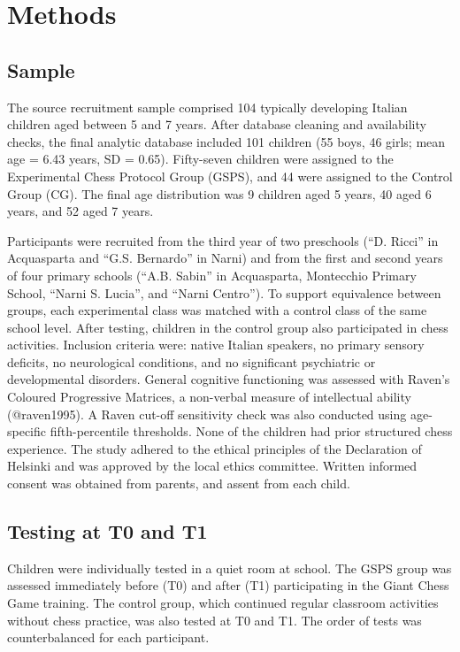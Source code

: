 \documentclass[
  letterpaper,
  DIV=11,
  numbers=noendperiod]{scrartcl}
\begin{document}
\section{Methods}\label{methods}

\subsection{Sample}\label{sample}

The source recruitment sample comprised 104 typically developing Italian
children aged between 5 and 7 years. After database cleaning and
availability checks, the final analytic database included 101 children
(55 boys, 46 girls; mean age = 6.43 years, SD = 0.65). Fifty-seven
children were assigned to the Experimental Chess Protocol Group (GSPS),
and 44 were assigned to the Control Group (CG). The final age
distribution was 9 children aged 5 years, 40 aged 6 years, and 52 aged 7
years.

Participants were recruited from the third year of two preschools (``D.
Ricci'' in Acquasparta and ``G.S. Bernardo'' in Narni) and from the
first and second years of four primary schools (``A.B. Sabin'' in
Acquasparta, Montecchio Primary School, ``Narni S. Lucia'', and ``Narni
Centro''). To support equivalence between groups, each experimental
class was matched with a control class of the same school level. After
testing, children in the control group also participated in chess
activities. Inclusion criteria were: native Italian speakers, no primary
sensory deficits, no neurological conditions, and no significant
psychiatric or developmental disorders. General cognitive functioning
was assessed with Raven's Coloured Progressive Matrices, a non-verbal
measure of intellectual ability (@raven1995). A Raven cut-off
sensitivity check was also conducted using age-specific fifth-percentile
thresholds. None of the children had prior structured chess experience.
The study adhered to the ethical principles of the Declaration of
Helsinki and was approved by the local ethics committee. Written
informed consent was obtained from parents, and assent from each child.

\subsection{Testing at T0 and T1}\label{testing-at-t0-and-t1}

Children were individually tested in a quiet room at school. The GSPS
group was assessed immediately before (T0) and after (T1) participating
in the Giant Chess Game training. The control group, which continued
regular classroom activities without chess practice, was also tested at
T0 and T1. The order of tests was counterbalanced for each participant.
\end{document}
